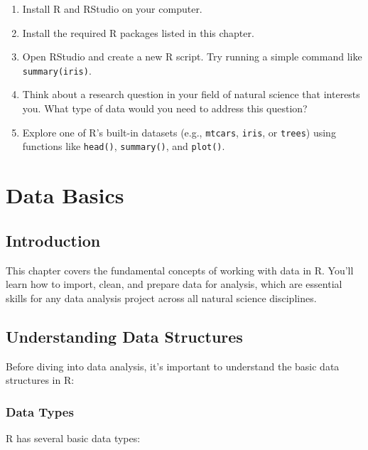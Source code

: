 \documentclass[
  letterpaper,
]{book}
\providecommand{\tightlist}{%
  \setlength{\itemsep}{0pt}\setlength{\parskip}{0pt}}
\begin{document}
\begin{enumerate}
\def\labelenumi{\arabic{enumi}.}
\tightlist
\item
  Install R and RStudio on your computer.
\item
  Install the required R packages listed in this chapter.
\item
  Open RStudio and create a new R script. Try running a simple command
  like \texttt{summary(iris)}.
\item
  Think about a research question in your field of natural science that
  interests you. What type of data would you need to address this
  question?
\item
  Explore one of R's built-in datasets (e.g., \texttt{mtcars},
  \texttt{iris}, or \texttt{trees}) using functions like
  \texttt{head()}, \texttt{summary()}, and \texttt{plot()}.
\end{enumerate}

\chapter{Data Basics}\label{data-basics}

\section{Introduction}\label{introduction}

This chapter covers the fundamental concepts of working with data in R.
You'll learn how to import, clean, and prepare data for analysis, which
are essential skills for any data analysis project across all natural
science disciplines.

\section{Understanding Data
Structures}\label{understanding-data-structures}

Before diving into data analysis, it's important to understand the basic
data structures in R:

\subsection{Data Types}\label{data-types}

R has several basic data types:
\end{document}
